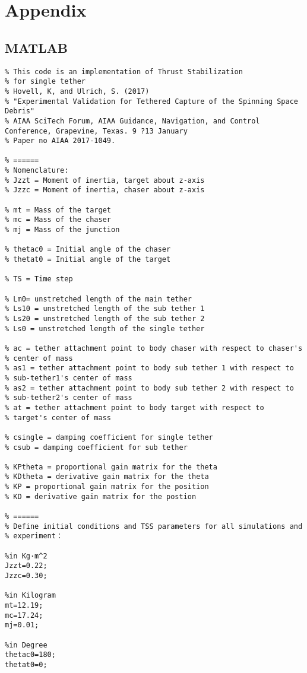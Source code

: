 \chapter{Appendix}\label{section-appendix} 
\section{MATLAB}
\begin{lstlisting}
% This code is an implementation of Thrust Stabilization
% for single tether
% Hovell, K, and Ulrich, S. (2017)
% "Experimental Validation for Tethered Capture of the Spinning Space Debris"
% AIAA SciTech Forum, AIAA Guidance, Navigation, and Control Conference, Grapevine, Texas. 9 ?13 January
% Paper no AIAA 2017-1049.

% ======
% Nomenclature:
% Jzzt = Moment of inertia, target about z-axis 
% Jzzc = Moment of inertia, chaser about z-axis

% mt = Mass of the target
% mc = Mass of the chaser
% mj = Mass of the junction

% thetac0 = Initial angle of the chaser 
% thetat0 = Initial angle of the target

% TS = Time step

% Lm0= unstretched length of the main tether
% Ls10 = unstretched length of the sub tether 1
% Ls20 = unstretched length of the sub tether 2
% Ls0 = unstretched length of the single tether

% ac = tether attachment point to body chaser with respect to chaser's
% center of mass
% as1 = tether attachment point to body sub tether 1 with respect to
% sub-tether1's center of mass
% as2 = tether attachment point to body sub tether 2 with respect to
% sub-tether2's center of mass
% at = tether attachment point to body target with respect to
% target's center of mass

% csingle = damping coefficient for single tether
% csub = damping coefficient for sub tether

% KPtheta = proportional gain matrix for the theta 
% KDtheta = derivative gain matrix for the theta
% KP = proportional gain matrix for the position
% KD = derivative gain matrix for the postion

% ======
% Define initial conditions and TSS parameters for all simulations and
% experiment：

%in Kg·m^2
Jzzt=0.22; 
Jzzc=0.30; 

%in Kilogram
mt=12.19; 
mc=17.24; 
mj=0.01;

%in Degree
thetac0=180; 
thetat0=0;


\end{lstlisting}

